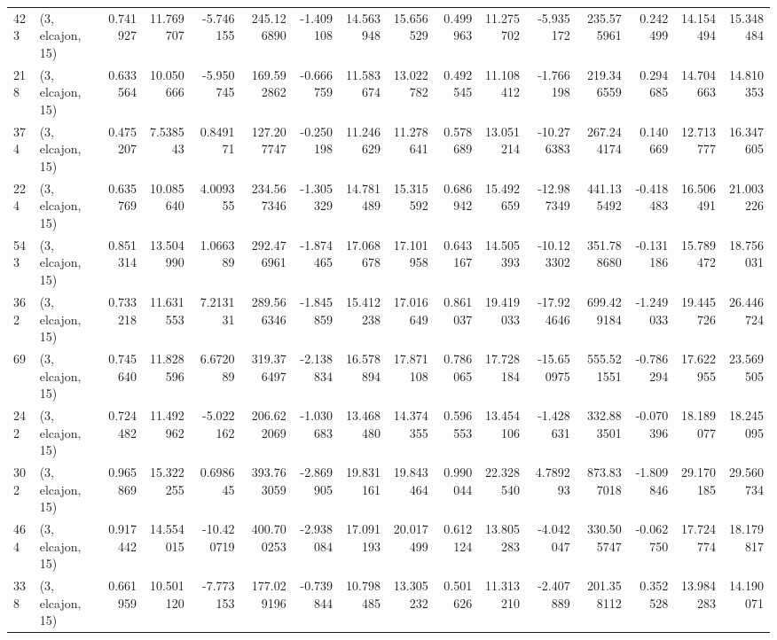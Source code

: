 \begin{tabular}{llrrrrrrrrrrrrrr}
423 &  (3, elcajon, 15) &   0.741927 &  11.769707 &  -5.746155 &   245.126890 &  -1.409108 &  14.563948 &  15.656529 &  0.499963 &  11.275702 &  -5.935172 &    235.575961 &   0.242499 &   14.154494 &   15.348484 \\
218 &  (3, elcajon, 15) &   0.633564 &  10.050666 &  -5.950745 &   169.592862 &  -0.666759 &  11.583674 &  13.022782 &  0.492545 &  11.108412 &  -1.766198 &    219.346559 &   0.294685 &   14.704663 &   14.810353 \\
374 &  (3, elcajon, 15) &   0.475207 &   7.538543 &   0.849171 &   127.207747 &  -0.250198 &  11.246629 &  11.278641 &  0.578689 &  13.051214 & -10.276383 &    267.244174 &   0.140669 &   12.713777 &   16.347605 \\
224 &  (3, elcajon, 15) &   0.635769 &  10.085640 &   4.009355 &   234.567346 &  -1.305329 &  14.781489 &  15.315592 &  0.686942 &  15.492659 & -12.987349 &    441.135492 &  -0.418483 &   16.506491 &   21.003226 \\
543 &  (3, elcajon, 15) &   0.851314 &  13.504990 &   1.066389 &   292.476961 &  -1.874465 &  17.068678 &  17.101958 &  0.643167 &  14.505393 & -10.123302 &    351.788680 &  -0.131186 &   15.789472 &   18.756031 \\
362 &  (3, elcajon, 15) &   0.733218 &  11.631553 &   7.213131 &   289.566346 &  -1.845859 &  15.412238 &  17.016649 &  0.861037 &  19.419033 & -17.924646 &    699.429184 &  -1.249033 &   19.445726 &   26.446724 \\
69  &  (3, elcajon, 15) &   0.745640 &  11.828596 &   6.672089 &   319.376497 &  -2.138834 &  16.578894 &  17.871108 &  0.786065 &  17.728184 & -15.650975 &    555.521551 &  -0.786294 &   17.622955 &   23.569505 \\
242 &  (3, elcajon, 15) &   0.724482 &  11.492962 &  -5.022162 &   206.622069 &  -1.030683 &  13.468480 &  14.374355 &  0.596553 &  13.454106 &  -1.428631 &    332.883501 &  -0.070396 &   18.189077 &   18.245095 \\
302 &  (3, elcajon, 15) &   0.965869 &  15.322255 &   0.698645 &   393.763059 &  -2.869905 &  19.831161 &  19.843464 &  0.990044 &  22.328540 &   4.789293 &    873.837018 &  -1.809846 &   29.170185 &   29.560734 \\
464 &  (3, elcajon, 15) &   0.917442 &  14.554015 & -10.420719 &   400.700253 &  -2.938084 &  17.091193 &  20.017499 &  0.612124 &  13.805283 &  -4.042047 &    330.505747 &  -0.062750 &   17.724774 &   18.179817 \\
338 &  (3, elcajon, 15) &   0.661959 &  10.501120 &  -7.773153 &   177.029196 &  -0.739844 &  10.798485 &  13.305232 &  0.501626 &  11.313210 &  -2.407889 &    201.358112 &   0.352528 &   13.984283 &   14.190071 \\

\end{tabular}
